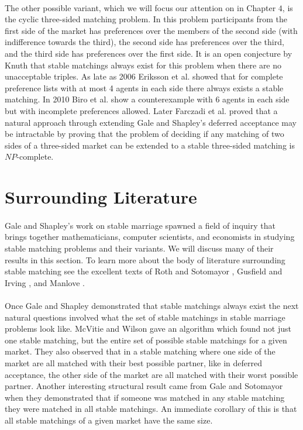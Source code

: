 \paragraph{}
The other possible variant, which we will focus our attention on in Chapter $4$, is the cyclic three-sided matching problem. In this problem participants from the first side of the market has preferences over the members of the second side (with indifference towards the third), the second side has preferences over the third, and the third side has preferences over the first side. It is an open conjecture by Knuth that stable matchings always exist for this problem when there are no unacceptable triples. As late as 2006 Eriksson et al. \cite{eriksson2006three} showed that for complete preference lists with at most 4 agents in each side there always exists a stable matching. In 2010 Biro et al. \cite{biro2010three} show a counterexample with 6 agents in each side but with incomplete preferences allowed. Later Farczadi et al. \cite{farczadi2014stable} proved that a natural approach through extending Gale and Shapley's deferred acceptance may be intractable by proving that the problem of deciding if any matching of two sides of a three-sided market can be extended to a stable three-sided matching is $NP$-complete.

\section{Surrounding Literature}

\paragraph{}
Gale and Shapley's work on stable marriage spawned a field of inquiry that brings together mathematicians, computer scientists, and economists in studying stable matching problems and their variants. We will discuss many of their results in this section. To learn more about the body of literature surrounding stable matching see the excellent texts of Roth and Sotomayor \cite{roth1992two}, Gusfield and Irving \cite{gusfield1989stable}, and Manlove \cite{manlove2013algorithmics}.

\paragraph{}
Once Gale and Shapley demonstrated that stable matchings always exist the next natural questions involved what the set of stable matchings in stable marriage problems look like. McVitie and Wilson \cite{mcvitie1971stable} gave an algorithm which found not just one stable matching, but the entire set of possible stable matchings for a given market. They also observed that in a stable matching where one side of the market are all matched with their best possible partner, like in deferred acceptance, the other side of the market are all matched with their worst possible partner. Another interesting structural result came from Gale and Sotomayor \cite{gale1985some} when they demonstrated that if someone was matched in any stable matching they were matched in all stable matchings. An immediate corollary of this is that all stable matchings of a given market have the same size.

